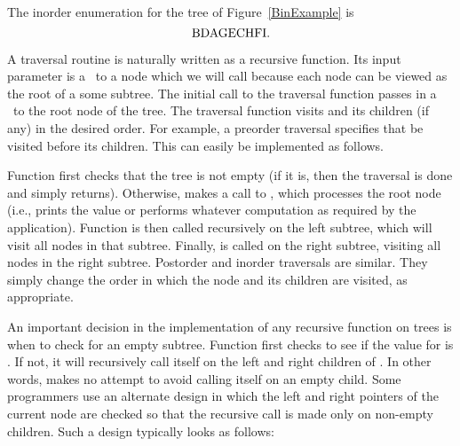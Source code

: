 \begin{example}
The inorder enumeration for the tree of Figure~\ref{BinExample}
is \[{\rm B D A G E C H F I.}\]

\vspace{-\smallskipamount}
\vspace{-\medskipamount}
\end{example}

A traversal routine is naturally written as a recursive
function.
Its input parameter is a \pointref\ to a node which we will call
because each node can be viewed as the root of a some
subtree.
The initial call to the traversal function passes in a \pointref\ to
the root node of the tree.
The traversal function visits
and its children (if any) 
in the desired order.
For example, a preorder traversal specifies that
be visited before its children.
This can easily be implemented as follows.


\noindent Function  first checks that the tree is not
empty (if it is, then the traversal is done and  simply
returns).
Otherwise,  makes  a call to ,
which processes the root node (i.e., prints the value or performs
whatever computation as required by the application).
Function  is then called recursively on the left
subtree, which will visit all nodes in that subtree.
Finally,  is called on the right subtree, visiting all
nodes in the right subtree.
Postorder and inorder traversals are similar.
They simply change the order in which the node and its children are
visited, as appropriate.

An important decision in the implementation of any recursive function
on trees is when to check for an empty subtree.
Function  first checks to see if the value for
is \NULL.
If not, it will recursively call itself on the left and right children
of
.
In other words,  makes no attempt to avoid calling
itself on an empty child.
Some programmers use an alternate design in which the left and
right pointers of the current node are checked so that the recursive
call is made only on non-empty children.
Such a design typically looks as follows:


